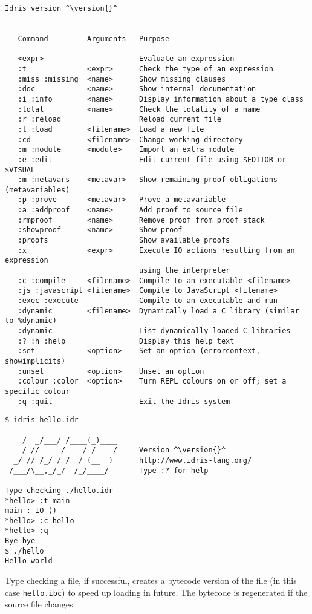\begin{lstlisting}[caption={Interactive environment commands}, label=cmds, escapechar=^]
Idris version ^\version{}^
--------------------

   Command         Arguments   Purpose
                               
   <expr>                      Evaluate an expression
   :t              <expr>      Check the type of an expression
   :miss :missing  <name>      Show missing clauses
   :doc            <name>      Show internal documentation
   :i :info        <name>      Display information about a type class
   :total          <name>      Check the totality of a name
   :r :reload                  Reload current file
   :l :load        <filename>  Load a new file
   :cd             <filename>  Change working directory
   :m :module      <module>    Import an extra module
   :e :edit                    Edit current file using $EDITOR or $VISUAL
   :m :metavars    <metavar>   Show remaining proof obligations (metavariables)
   :p :prove       <metavar>   Prove a metavariable
   :a :addproof    <name>      Add proof to source file
   :rmproof        <name>      Remove proof from proof stack
   :showproof      <name>      Show proof
   :proofs                     Show available proofs
   :x              <expr>      Execute IO actions resulting from an expression 
                               using the interpreter
   :c :compile     <filename>  Compile to an executable <filename>
   :js :javascript <filename>  Compile to JavaScript <filename>
   :exec :execute              Compile to an executable and run
   :dynamic        <filename>  Dynamically load a C library (similar to %dynamic)
   :dynamic                    List dynamically loaded C libraries
   :? :h :help                 Display this help text
   :set            <option>    Set an option (errorcontext, showimplicits)
   :unset          <option>    Unset an option
   :colour :color  <option>    Turn REPL colours on or off; set a specific colour
   :q :quit                    Exit the Idris system
\end{lstlisting}

\begin{lstlisting}[caption={Sample Interactive Run}, label=run1, escapechar=^]
$ idris hello.idr
     ____    __     _                                          
    /  _/___/ /____(_)____                                     
    / // __  / ___/ / ___/     Version ^\version{}^
  _/ // /_/ / /  / (__  )      http://www.idris-lang.org/      
 /___/\__,_/_/  /_/____/       Type :? for help        

Type checking ./hello.idr
*hello> :t main 
main : IO ()
*hello> :c hello 
*hello> :q 
Bye bye
$ ./hello 
Hello world
\end{lstlisting}

\noindent
Type checking a file, if successful, creates a bytecode version of the file (in this case \texttt{hello.ibc}) to speed up loading in future.
The bytecode is regenerated if the source file changes.

